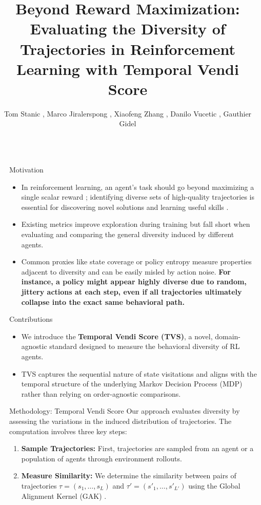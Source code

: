 \documentclass[final]{beamer}
\title{Beyond Reward Maximization: Evaluating the Diversity of Trajectories in Reinforcement Learning with Temporal Vendi Score}
\author{Tom Stanic \inst{1}, Marco Jiralerspong \inst{1, 2}, Xiaofeng Zhang \inst{1, 2}, Danilo Vucetic \inst{1, 2}, Gauthier Gidel \inst{1, 2, 3}}
\institute[shortinst]{\inst{1} Université de Montréal \samelineand \inst{2} Mila -- Institut Québécois d'Intelligence Artificielle \samelineand \inst{3} CIFAR}
\newlength{\sepwidth}
\newlength{\colwidth}
\newcommand{\separatorcolumn}{\begin{column}{\sepwidth}\end{column}}
\begin{document}
\begin{frame}[t]
\begin{columns}[t]
\separatorcolumn

\begin{column}{\colwidth}
  \begin{block}{Motivation}
    \begin{itemize}
      \item In reinforcement learning, an agent's task should go beyond maximizing a single scalar reward \cite{Sutton1998}; identifying diverse sets of high-quality trajectories is essential for discovering novel solutions and learning useful skills \cite{eysenbach2018diversityneedlearningskills}.
      \item Existing metrics improve exploration during training but fall short when evaluating and comparing the general diversity induced by different agents.
      \item Common proxies like state coverage or policy entropy measure properties adjacent to diversity and can be easily misled by action noise. \textbf{For instance, a policy might appear highly diverse due to random, jittery actions at each step, even if all trajectories ultimately collapse into the exact same behavioral path.}
    \end{itemize}
  \end{block}

  \begin{block}{Contributions}
    \begin{itemize}
      \item We introduce the \textbf{Temporal Vendi Score (TVS)}, a novel, domain-agnostic standard designed to measure the behavioral diversity of RL agents.
      \item TVS captures the sequential nature of state visitations and aligns with the temporal structure of the underlying Markov Decision Process (MDP) rather than relying on order-agnostic comparisons.
    \end{itemize}
  \end{block}

  \begin{alertblock}{Methodology: Temporal Vendi Score}
    Our approach evaluates diversity by assessing the variations in the induced distribution of trajectories. The computation involves three key steps:
    \begin{enumerate}
      \item \textbf{Sample Trajectories:} First, trajectories are sampled from an agent or a population of agents through environment rollouts.
      \item \textbf{Measure Similarity:} We determine the similarity between pairs of trajectories $\tau = (s_1, \dots, s_L)$ and $\tau' = (s'_1, \dots, s'_{L'})$ using the Global Alignment Kernel (GAK) \cite{cuturi2007kernel}. 
      

\end{enumerate}
\end{alertblock}
\end{column}
\end{columns}
\end{frame}
\end{document}
